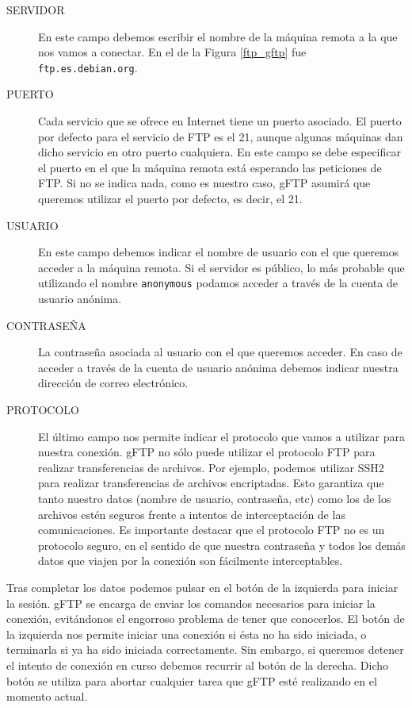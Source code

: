 \begin{description}

\item[SERVIDOR]  En  este  campo  debemos escribir  el  nombre  de  la
máquina remota  a la  que nos  vamos a  conectar. En  el de  la Figura
\ref{ftp_gftp} fue {\tt ftp.es.debian.org}.

\item[PUERTO] Cada servicio que se  ofrece en Internet tiene un puerto
asociado. El  puerto por  defecto para  el servicio de  FTP es  el 21,
aunque algunas máquinas dan dicho  servicio en otro puerto cualquiera.
En  este campo  se debe  especificar el  puerto en  el que  la máquina
remota está  esperando las peticiones  de FTP.  Si no se  indica nada,
como  es nuestro  caso, {\sf  gFTP} asumirá  que queremos  utilizar el
puerto por defecto, es decir, el 21.

\item[USUARIO] En este campo debemos  indicar el nombre de usuario con
el  que queremos  acceder  a  la máquina  remota.  Si  el servidor  es
público,  lo más  probable que  utilizando el  nombre {\tt  anonymous}
podamos acceder a través de la cuenta de usuario anónima.

\item[CONTRASEÑA]  La  contraseña  asociada  al  usuario  con  el  que
queremos acceder. En caso de acceder  a través de la cuenta de usuario
anónima debemos indicar nuestra dirección de correo electrónico.

\item[PROTOCOLO] El último campo nos  permite indicar el protocolo que
vamos  a utilizar  para nuestra  conexión.  {\sf gFTP}  no sólo  puede
utilizar el  protocolo FTP  para realizar transferencias  de archivos.
Por  ejemplo,  podemos  utilizar  SSH2  para  realizar  transferencias
de  archivos  encriptadas.  Esto  garantiza que  tanto  nuestro  datos
(nombre de  usuario, contraseña, etc)  como los de los  archivos estén
seguros frente a intentos de  interceptación de las comunicaciones. Es
importante destacar que el protocolo FTP no es un protocolo seguro, en
el  sentido de  que nuestra  contraseña y  todos los  demás datos  que
viajen por la conexión son fácilmente interceptables.

\end{description}

Tras completar  los datos podemos pulsar  en el botón de  la izquierda
para iniciar la  sesión. {\sf gFTP} se encarga de  enviar los comandos
necesarios para iniciar la conexión, evitándonos el engorroso problema
de tener que conocerlos. El botón  de la izquierda nos permite iniciar
una conexión si ésta  no ha sido iniciada, o terminarla  si ya ha sido
iniciada correctamente. Sin embargo, si queremos detener el intento de
conexión en curso debemos recurrir al botón de la derecha. Dicho botón
se utiliza para abortar cualquier tarea que {\sf gFTP} esté realizando
en el momento actual.

